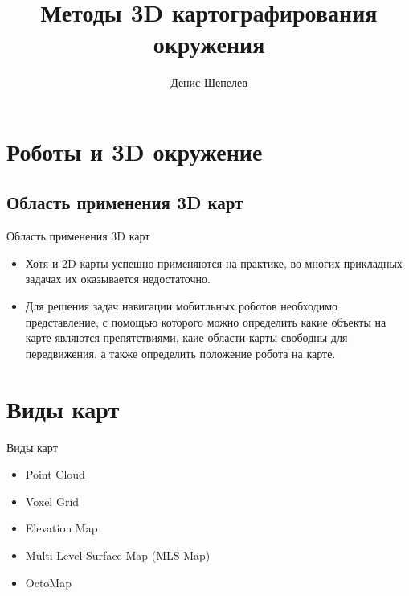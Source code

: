 \documentclass[9pt]{beamer}
\title{Методы 3D картографирования окружения}
\author{Денис Шепелев}
\institute[Universities of Somewhere and Elsewhere] %
{
  073а\\
}
\date{}
\begin{document}
\begin{frame}
  \titlepage
\end{frame}


\section{Роботы и 3D окружение}

\subsection{Область применения 3D карт}

\begin{frame}{Область применения 3D карт}
  \begin{itemize}
  \item 
  {
    Хотя и 2D карты успешно применяются на практике, во многих прикладных задачах их оказывается недостаточно. 
  }
  \item 
  {
    Для решения задач навигации мобитльных роботов необходимо представление, с помощью которого можно определить какие объекты на карте являются препятствиями, каие области карты свободны для передвижения, а также определить положение робота на карте.
  }
  \end{itemize}
\end{frame}

\section{Виды карт}

\begin{frame}{Виды карт}
  \begin{itemize}
  \item 
  {
    Point Cloud  
  }
  \item 
  {   
    Voxel Grid
  }
  \item
  {
    Elevation Map
  }
  \item
  {
    Multi-Level Surface Map (MLS Map) 
  }
  \item
  {
    OctoMap
  }
  \end{itemize}
\end{frame}
\end{document}
